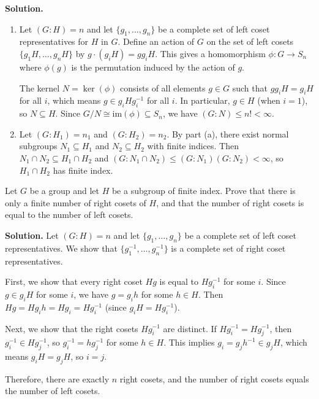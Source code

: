 \noindent\textbf{Solution.}
\begin{enumerate}[label=(\alph*)]
\item Let $(G : H) = n$ and let $\{g_1, \ldots, g_n\}$ be a complete set of left coset representatives for $H$ in $G$. Define an action of $G$ on the set of left cosets $\{g_1H, \ldots, g_nH\}$ by $g \cdot (g_iH) = gg_iH$. This gives a homomorphism $\phi: G \to S_n$ where $\phi(g)$ is the permutation induced by the action of $g$.

The kernel $N = \ker(\phi)$ consists of all elements $g \in G$ such that $gg_iH = g_iH$ for all $i$, which means $g \in g_iHg_i^{-1}$ for all $i$. In particular, $g \in H$ (when $i = 1$), so $N \subseteq H$. Since $G/N \cong \text{im}(\phi) \subseteq S_n$, we have $(G : N) \leq n! < \infty$.

\item Let $(G : H_1) = n_1$ and $(G : H_2) = n_2$. By part (a), there exist normal subgroups $N_1 \subseteq H_1$ and $N_2 \subseteq H_2$ with finite indices. Then $N_1 \cap N_2 \subseteq H_1 \cap H_2$ and $(G : N_1 \cap N_2) \leq (G : N_1)(G : N_2) < \infty$, so $H_1 \cap H_2$ has finite index.
\end{enumerate}

\begin{problembox}
Let $G$ be a group and let $H$ be a subgroup of finite index. Prove that there is only a finite number of right cosets of $H$, and that the number of right cosets is equal to the number of left cosets.
\end{problembox}

\noindent\textbf{Solution.} Let $(G : H) = n$ and let $\{g_1, \ldots, g_n\}$ be a complete set of left coset representatives. We show that $\{g_1^{-1}, \ldots, g_n^{-1}\}$ is a complete set of right coset representatives.

First, we show that every right coset $Hg$ is equal to $Hg_i^{-1}$ for some $i$. Since $g \in g_iH$ for some $i$, we have $g = g_ih$ for some $h \in H$. Then $Hg = Hg_ih = Hg_i = Hg_i^{-1}$ (since $g_iH = Hg_i^{-1}$).

Next, we show that the right cosets $Hg_i^{-1}$ are distinct. If $Hg_i^{-1} = Hg_j^{-1}$, then $g_i^{-1} \in Hg_j^{-1}$, so $g_i^{-1} = hg_j^{-1}$ for some $h \in H$. This implies $g_i = g_jh^{-1} \in g_jH$, which means $g_iH = g_jH$, so $i = j$.

Therefore, there are exactly $n$ right cosets, and the number of right cosets equals the number of left cosets.

